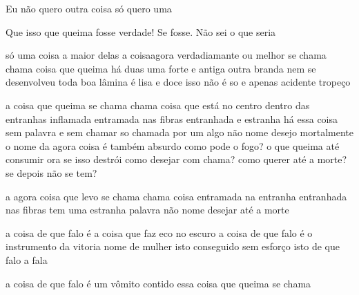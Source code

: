 \begin{poem}
\begin{stanza}
Eu não quero outra coisa\verseline
só quero uma
\end{stanza}
\begin{stanza}
Que isso que queima fosse verdade!\verseline
Se fosse. Não sei\verseline
o que seria
\end{stanza}
\begin{stanza}
só uma coisa \qquad a maior delas\verseline
a coisaagora \qquad verdadiamante\verseline
ou melhor \qquad se chama\verseline
chama \qquad coisa que queima\verseline
há duas \qquad uma\verseline
forte e antiga \qquad outra\verseline
branda \qquad nem se desenvolveu\verseline
\qquad toda boa lâmina\verseline
é lisa \qquad e doce\verseline
isso não \qquad é so e apenas\verseline
acidente\verseline
\qquad \qquad tropeço
\end{stanza}
\begin{stanza}
a coisa que queima se chama\verseline
\qquad \qquad \qquad \qquad \qquad chama\verseline
coisa que está no centro\verseline
\qquad \qquad \qquad \qquad \qquad dentro das entranhas\verseline
inflamada entramada nas fibras\verseline
entranhada e estranha\verseline
\qquad há essa coisa sem palavra\verseline
\qquad e sem chamar \qquad so chamada\verseline
\qquad por um algo não nome\verseline
\qquad desejo mortalmente\verseline
o nome da agora coisa é também absurdo\verseline
como pode o fogo?\verseline
\qquad \qquad \qquad \qquad \qquad o que queima até consumir\verseline
ora se isso destrói \qquad como desejar com\verseline
chama? \qquad como querer até a morte?\verseline
se depois não se tem?
\end{stanza}
\begin{stanza}
a agora coisa que levo se chama\verseline
chama\verseline
coisa entramada na entranha\verseline
entranhada nas fibras\verseline
tem uma estranha palavra não nome\verseline
desejar até a morte
\end{stanza}
\begin{stanza}
a coisa de que falo é a coisa\verseline
que faz eco no escuro\verseline
a coisa de que falo é\verseline
o instrumento da vitoria\verseline
\qquad nome de mulher\verseline
isto conseguido sem esforço\verseline
isto de que falo\verseline
a fala
\end{stanza}
\begin{stanza}
a coisa de que falo\verseline
é um vômito contido\verseline
essa coisa que queima se chama\verseline

\end{stanza}
\end{poem}
